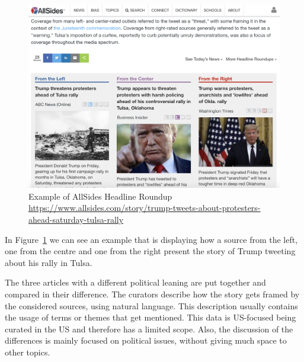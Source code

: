 \begin{figure}[!htb]
    \centering
    \includegraphics[width=\linewidth]{figures/allsides.png}
    \caption{Example of AllSides Headline Roundup \url{https://www.allsides.com/story/trump-tweets-about-protesters-ahead-saturday-tulsa-rally}}
    \label{fig:allsides}
\end{figure}

In Figure~\ref{fig:allsides} we can see an example that is displaying how a source from the left, one from the centre and one from the right present the story of Trump tweeting about his rally in Tulsa.



The three articles with a different political leaning are put together and compared in their difference.
The curators describe how the story gets framed by the considered sources, using natural language.
This description usually contains the usage of terms or themes that get mentioned.
This data is US-focused being curated in the US and therefore has a limited scope. Also, the discussion of the differences is mainly focused on political issues, without giving much space to other topics.


